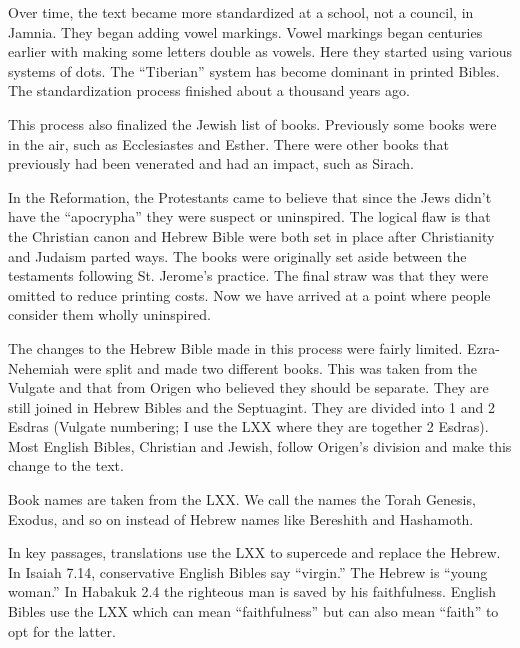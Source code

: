 \documentclass{beamer}
\begin{document}
\begin{frame}
  Over time, the text became more standardized at a school, not a council, in Jamnia.
  They began adding vowel markings.
  Vowel markings began centuries earlier with making some letters double as vowels.
  Here they started using various systems of dots.
  The ``Tiberian'' system has become dominant in printed Bibles.
  The standardization process finished about a thousand years ago.
\end{frame}

\begin{frame}
  This process also finalized the Jewish list of books.
  Previously some books were in the air, such as Ecclesiastes and Esther.
  There were other books that previously had been venerated and had an impact, such as Sirach.
\end{frame}

\begin{frame}
  In the Reformation, the Protestants came to believe that since the Jews didn't have the ``apocrypha'' they were suspect or uninspired.
  The logical flaw is that the Christian canon and Hebrew Bible were both set in place after Christianity and Judaism parted ways.
  The books were originally set aside between the testaments following St. Jerome's practice.
  The final straw was that they were omitted to reduce printing costs.
  Now we have arrived at a point where people consider them wholly uninspired.
\end{frame}

\begin{frame}
  The changes to the Hebrew Bible made in this process were fairly limited.
  Ezra-Nehemiah were split and made two different books.
  This was taken from the Vulgate and that from Origen who believed they should be separate.
  They are still joined in Hebrew Bibles and the Septuagint.
  They are divided into 1 and 2 Esdras (Vulgate numbering; I use the LXX where they are together 2 Esdras).
  Most English Bibles, Christian and Jewish, follow Origen's division and make this change to the text.
\end{frame}

\begin{frame}
  Book names are taken from the LXX.
  We call the names the Torah Genesis, Exodus, and so on instead of Hebrew names like Bereshith and Hashamoth.
\end{frame}

\begin{frame}
  In key passages, translations use the LXX to supercede and replace the Hebrew.
  In Isaiah 7.14, conservative English Bibles say ``virgin.''
  The Hebrew is ``young woman.''
  In Habakuk 2.4 the righteous man is saved by his faithfulness.
  English Bibles use the LXX which can mean ``faithfulness'' but can also mean ``faith'' to opt for the latter.
\end{frame}
\end{document}
